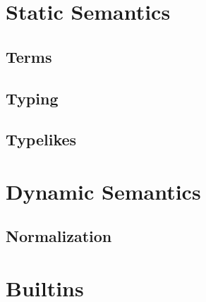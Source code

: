 \documentclass{article}
\begin{document}
\section{Static Semantics}
	\subsection{Terms}
	\subsection{Typing}
	\subsection{Typelikes}

\section{Dynamic Semantics}
	\subsection{Normalization}

\section{Builtins}
\end{document}
